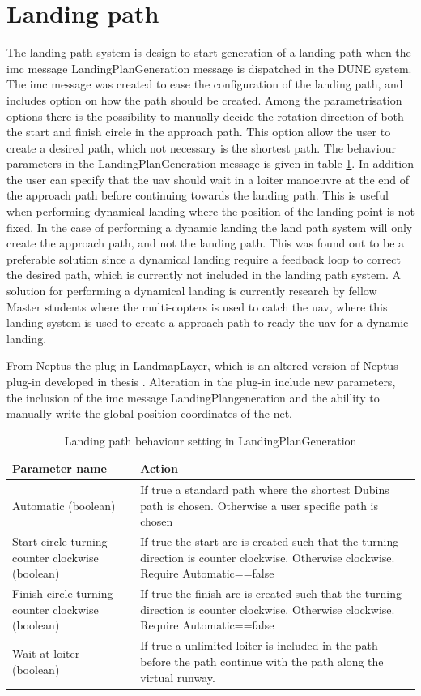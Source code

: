 \section{Landing path}
The landing path system is design to start generation of a landing path when the \gls{imc} message LandingPlanGeneration message is dispatched in the DUNE system. The \gls{imc} message was created to ease the configuration of the landing path, and includes option on how the path should be created. Among the parametrisation options there is the possibility to manually decide the rotation direction of both the start and finish circle in the approach path. This option allow the user to create a desired path, which not necessary is the shortest path. The behaviour parameters in the LandingPlanGeneration message is given in table \ref{Tb:DubinConfig}. In addition the user can specify that the \gls{uav} should wait in a loiter manoeuvre at the end of the approach path before continuing towards the landing path. This is useful when performing dynamical landing where the position of the landing point is not fixed. In the case of performing a dynamic landing the land path system will only create the approach path, and not the landing path. This was found out to be a preferable solution since a dynamical landing require a feedback loop to correct the desired path, which is currently not included in the landing path system. A solution for performing a dynamical landing is currently research by fellow Master students where the multi-copters is used to catch the \gls{uav}, where this landing system is used to create a approach path to ready the \gls{uav} for a dynamic landing.

From Neptus the plug-in LandmapLayer, which is an altered version of Neptus plug-in developed in thesis \citep{Froelich}. Alteration in the plug-in include new parameters, the inclusion of the \gls{imc} message LandingPlangeneration and the abillity to manually write the global position coordinates of the net.
\begin{table}
\centering
\begin{tabular}{| p{2.7cm} | | p{6cm} |}
\hline
\textbf{Parameter name} 							& \textbf{Action} \\ \hline
 Automatic (boolean)								& If true a standard path where the shortest Dubins path is chosen. Otherwise a user specific path is chosen \\ \hline
Start circle turning counter clockwise (boolean)	& If true the start arc is created such that the turning direction is counter clockwise. Otherwise clockwise. Require Automatic==false \\ \hline
Finish circle turning counter clockwise (boolean)	& If true the finish arc is created such that the turning direction is counter clockwise. Otherwise clockwise. Require Automatic==false \\ \hline
Wait at loiter (boolean)							& If true a unlimited loiter is included in the path before the path continue with the path along the virtual runway. \\ \hline

\end{tabular}
\caption{Landing path behaviour setting in LandingPlanGeneration}
\label{Tb:DubinConfig}
\end{table}
